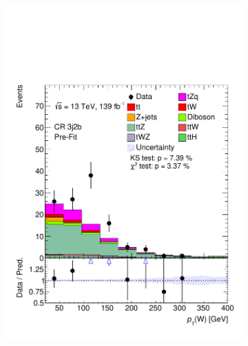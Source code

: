 \begin{figure}[!h]
\begin{subfigure}[b]{0.33\linewidth}
    \includegraphics[width=\linewidth]{ubonn-thesis/Chapters/Chapters_06/Figure/Input_distribution/CR_3j2b_W_pt.pdf} 
  \end{subfigure}%
  \newline
  \begin{subfigure}[b]{0.33\linewidth}
    \centering

\end{subfigure}
\end{figure}

